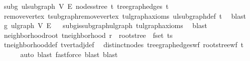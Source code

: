 \begin{isabellebody}
\isamarkupfalse%
\ subg{\isacharcolon}{\kern0pt}\ ulsubgraph\ V{\isacharprime}{\kern0pt}\ E{\isacharprime}{\kern0pt}\ {\isachardoublequoteopen}nodes{\isacharunderscore}{\kern0pt}stree\ t{\isachardoublequoteclose}\ {\isachardoublequoteopen}tree{\isacharunderscore}{\kern0pt}graph{\isacharunderscore}{\kern0pt}edges\ t{\isachardoublequoteclose}%
\isadelimproof
\ %
\endisadelimproof
%
\isatagproof
{}\isamarkupfalse%
\ remove{\isacharunderscore}{\kern0pt}vertex\ t{\isachardot}{\kern0pt}subgraph{\isacharunderscore}{\kern0pt}remove{\isacharunderscore}{\kern0pt}vertex\ t{\isachardot}{\kern0pt}ulgraph{\isacharunderscore}{\kern0pt}axioms\ ulsubgraph{\isacharunderscore}{\kern0pt}def\ t\ \isamarkupfalse%
\ blast%
\endisatagproof
{\isafoldproof}%
%
\isadelimproof
%
\endisadelimproof
\isanewline
\isanewline
{}\isamarkupfalse%
\ g{\isacharprime}{\kern0pt}{\isacharcolon}{\kern0pt}\ ulgraph\ V{\isacharprime}{\kern0pt}\ E{\isacharprime}{\kern0pt}%
\isadelimproof
\ %
\endisadelimproof
%
\isatagproof
{}\isamarkupfalse%
\ subg{\isachardot}{\kern0pt}is{\isacharunderscore}{\kern0pt}subgraph{\isacharunderscore}{\kern0pt}ulgraph\ t{\isachardot}{\kern0pt}ulgraph{\isacharunderscore}{\kern0pt}axioms\ \isamarkupfalse%
\ blast%
\endisatagproof
{\isafoldproof}%
%
\isadelimproof
%
\endisadelimproof
\isanewline
\isanewline
{}\isamarkupfalse%
\ neighborhood{\isacharunderscore}{\kern0pt}root{\isacharcolon}{\kern0pt}\ {\isachardoublequoteopen}t{\isachardot}{\kern0pt}neighborhood\ r\ {\isacharequal}{\kern0pt}\ root{\isacharunderscore}{\kern0pt}stree\ {\isacharbackquote}{\kern0pt}\ fset\ ts{\isachardoublequoteclose}\isanewline
%
\isadelimproof
\ \ %
\endisadelimproof
%
\isatagproof
{}\isamarkupfalse%
\ t{\isachardot}{\kern0pt}neighborhood{\isacharunderscore}{\kern0pt}def\ t{\isachardot}{\kern0pt}vert{\isacharunderscore}{\kern0pt}adj{\isacharunderscore}{\kern0pt}def\ \isamarkupfalse%
\ distinct{\isacharunderscore}{\kern0pt}nodes\ tree{\isacharunderscore}{\kern0pt}graph{\isacharunderscore}{\kern0pt}edges{\isacharunderscore}{\kern0pt}wf\ root{\isacharunderscore}{\kern0pt}stree{\isacharunderscore}{\kern0pt}wf\ t\isanewline
\ \ \ \ \isamarkupfalse%
\ {\isacharparenleft}{\kern0pt}auto{\isacharcomma}{\kern0pt}\ blast{\isacharcomma}{\kern0pt}\ fastforce{\isacharcomma}{\kern0pt}\ blast{\isacharcomma}{\kern0pt}\ blast{\isacharparenright}{\kern0pt}%
\endisatagproof
{\isafoldproof}%
%
\isadelimproof
\isanewline
%
\endisadelimproof

\end{isabellebody}
